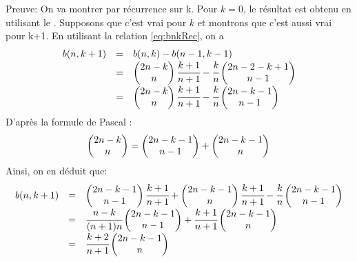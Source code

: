 Preuve:
On va montrer par récurrence sur k. Pour $k=0$, le résultat est obtenu en utilisant le .
Supposons que c'est vrai pour $k$ et montrons que c'est aussi vrai pour k+1. En utilisant la relation \eqref{eq:bnkRec}, on a
\[
	\begin{array} {l l l}
		b(n,k+1) & = & b(n,k)-b(n-1,k-1)                                                                                           \\
		         & = & \begin{pmatrix} 2n-k\\n\end{pmatrix}\cfrac{k+1}{n+1}-\cfrac{k}{n}\begin{pmatrix} 2n-2-k+1\\n-1\end{pmatrix} \\
		         & = & \begin{pmatrix} 2n-k\\n\end{pmatrix}\cfrac{k+1}{n+1}-\cfrac{k}{n}\begin{pmatrix} 2n-k-1\\n-1\end{pmatrix}   \\
	\end{array}
\]
D'après la formule de Pascal :\[\begin{pmatrix} 2n-k\\n\end{pmatrix}=\begin{pmatrix} 2n-k-1\\n-1\end{pmatrix}+\begin{pmatrix} 2n-k-1\\n\end{pmatrix}\\\]
Ainsi, on en déduit que:
\[
	\begin{array}{l l l}
		b(n,k+1) & = & \begin{pmatrix} 2n-k-1\\n-1\end{pmatrix}\cfrac{k+1}{n+1}+\begin{pmatrix} 2n-k-1\\n\end{pmatrix}\cfrac{k+1}{n+1}-\cfrac{k}{n}\begin{pmatrix} 2n-k-1\\n-1\end{pmatrix} \\
		         & = & \cfrac{n-k}{(n+1)n}\begin{pmatrix} 2n-k-1\\n-1\end{pmatrix}+\cfrac{k+1}{n+1}\begin{pmatrix} 2n-k-1\\n\end{pmatrix}                                                   \\
		         & = & \cfrac{k+2}{n+1}\begin{pmatrix} 2n-k-1\\n\end{pmatrix} \hspace{10pt}
	\end{array}\vspace{10pt}
\]
